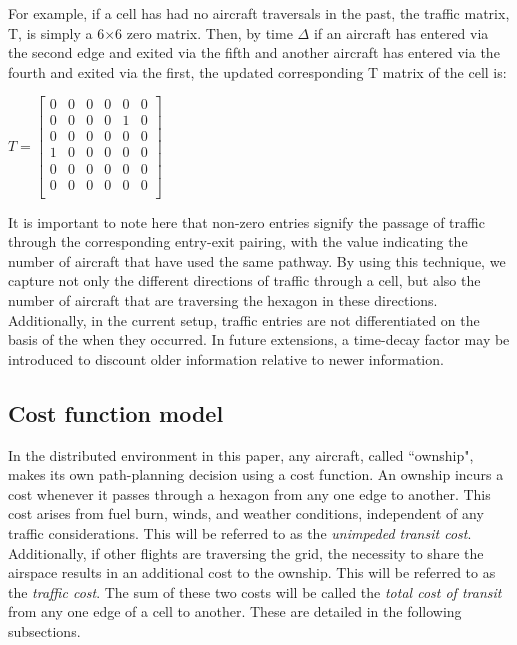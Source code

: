 \documentclass[conference, letter]{IEEEtran}
\begin{document}
For example, if a cell has had no aircraft traversals in the past, the traffic matrix, T, is simply a 6$\times$6 zero matrix. Then, by time $\Delta $ if an aircraft has entered via the second edge and exited via the fifth and another aircraft has entered via the fourth and exited via the first, the updated corresponding T matrix of the cell is: 
\begin{center}
$ T = \begin{bmatrix}
    0 & 0 & 0 & 0 & 0 & 0\\
    0 & 0 & 0 & 0 & 1 & 0\\
    0 & 0 & 0 & 0 & 0 & 0\\
    1 & 0 & 0 & 0 & 0 & 0\\
    0 & 0 & 0 & 0 & 0 & 0\\
    0 & 0 & 0 & 0 & 0 & 0\\
    \end{bmatrix}
$
\end{center}
\vspace{0.05cm}

It is important to note here that non-zero entries signify the passage of traffic through the corresponding entry-exit pairing, with the value indicating the number of aircraft that have used the same pathway. By using this technique, we capture not only the different directions of traffic through a cell, but also the number of aircraft that are traversing the hexagon in these directions. Additionally, in the current setup, traffic entries are not differentiated on the basis of the when they occurred. In future extensions, a time-decay factor may be introduced to discount older information relative to newer information. 
\subsection{Cost function model} \label{subsec:concepts}

In the distributed environment in this paper, any aircraft, called ``ownship", makes its own path-planning decision using a cost function. An ownship incurs a cost whenever it passes through a hexagon from any one edge to another. This cost arises from fuel burn, winds, and weather conditions, independent of any traffic considerations. This will be referred to as the \textit{unimpeded transit cost}. Additionally, if other flights are traversing the grid, the necessity to share the airspace results in an additional cost to the ownship. This will be referred to as the \textit{traffic cost}. The sum of these two costs will be called the \textit{total cost of transit} from any one edge of a cell to another. These are detailed in the following subsections. 
\end{document}
